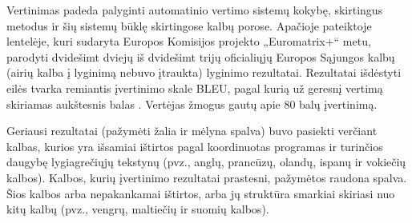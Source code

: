 \begin{multicols}{2}
    Vertinimas padeda palyginti automatinio vertimo sistemų kokybę, skirtingus metodus ir šių sistemų būklę skirtingose kalbų porose. Apačioje pateiktoje lentelėje, kuri sudaryta Europos Komisijos projekto „Euromatrix+“ metu, parodyti dvidešimt dviejų iš dvidešimt trijų oficialiųjų Europos Sąjungos kalbų (airių kalba į lyginimą nebuvo įtraukta) lyginimo rezultatai. Rezultatai išdėstyti eilės tvarka remiantis įvertinimo skale BLEU, pagal kurią už geresnį vertimą skiriamas aukštesnis balas \cite{bleu1}.  Vertėjas žmogus gautų apie 80 balų įvertinimą.   

    Geriausi rezultatai (pažymėti žalia ir mėlyna spalva) buvo pasiekti verčiant kalbas, kurios yra išsamiai ištirtos pagal koordinuotas programas ir turinčios daugybę lygiagrečiųjų tekstynų (pvz., anglų, prancūzų, olandų, ispanų ir vokiečių kalbos). Kalbos, kurių įvertinimo rezultatai prastesni, pažymėtos raudona spalva. Šios kalbos arba nepakankamai ištirtos, arba jų struktūra smarkiai skiriasi nuo kitų kalbų (pvz., vengrų, maltiečių ir suomių kalbos).


\end{multicols}
